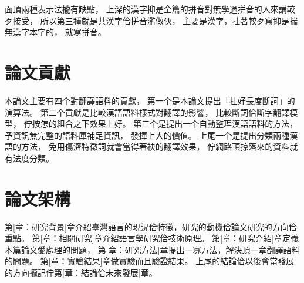 面頂兩種表示法攏有缺點，
上深的漢字抑是全篇的拼音對無學過拼音的人來講較歹接受，
所以第三種就是共漢字佮拼音濫做伙，
主要是漢字，拄著較歹寫抑是揣無漢字本字的，
就寫拼音。

\section{論文貢獻}
\label{節：論文貢獻}
本論文主要有四个對翻譯語料的貢獻，
第一个是本論文提出「拄好長度斷詞」的演算法。
第二个貢獻是比較漢語語料樣式對翻譯的影響，
比較斷詞佮斷字翻譯模型，
佇按怎的組合之下效果上好。
第三个是提出一个自動整理漢語語料的方法，
予資訊無完整的語料庫補足資訊，
發揮上大的價值。
上尾一个是提出分類兩種漢語的方法，
免用傷濟特徵詞就會當得著袂的翻譯效果，
佇網路頂掠落來的資料就有法度分類。

\section{論文架構}
\label{節：論文架構}

第\ref{章：研究背景}章介紹臺灣語言的現況佮特徵，研究的動機佮論文研究的方向佮重點。
第\ref{章：相關研究}章介紹語言學研究佮技術原理。
第\ref{章：研究介紹}章定義本篇論文愛處理的問題，
第\ref{章：研究方法}章提出一寡方法，解決頂一章翻譯語料的問題。
第\ref{章：實驗結果}章做實驗而且驗證結果。
上尾的結論佮以後會當發展的方向攏記佇第\ref{章：結論佮未來發展}章。
